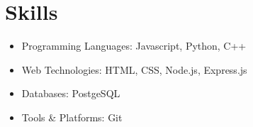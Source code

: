 \documentclass[a4paper,11pt]{article}
\newcommand{\resumeItem}[1]{
  \item\small{
    {#1 \vspace{-2pt}}
  }
}
\newcommand{\resumeSubItem}[1]{\resumeItem{#1}\vspace{-4pt}}
\newcommand{\resumeSubHeadingListStart}{\begin{itemize}[leftmargin=*]}
\newcommand{\resumeSubHeadingListEnd}{\end{itemize}}
\begin{document}
\section{Skills}
  \resumeSubHeadingListStart
    \resumeSubItem{Programming Languages: Javascript, Python, C++}
    \resumeSubItem{Web Technologies: HTML, CSS, Node.js, Express.js}
    \resumeSubItem{Databases: PostgeSQL}
    \resumeSubItem{Tools \& Platforms: Git}
  \resumeSubHeadingListEnd
\end{document}
